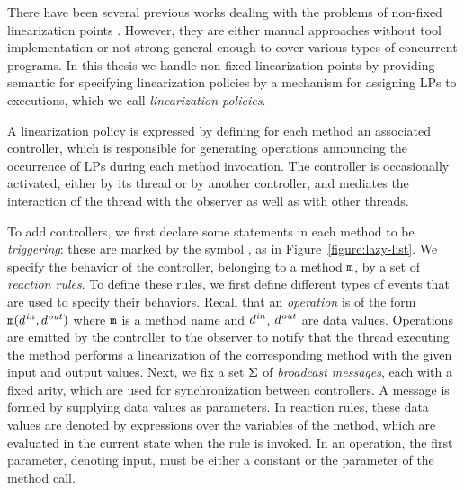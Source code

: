  There have been several previous works dealing with the problems of non-fixed linearization points \cite{Poling,Colvin:Lazy-List,CGLM:cav06,SWD:cav12,Derrick:fm14,SDW:tcl14,Vafeiadis:cav10,Vafeiadis:Aspect}. However, they are either manual approaches without tool implementation or not strong general enough to cover various types of concurrent programs. 
 In this thesis we handle non-fixed linearization points by providing semantic for specifying linearization policies by a mechanism for assigning LPs to executions, which we call \emph{linearization policies}. %

A linearization policy is expressed by defining for each method an associated controller, which is responsible for generating operations announcing the occurrence of LPs during each method invocation. The controller is occasionally activated, either by its thread or by another controller, and mediates the interaction of the thread with the
observer as well as with other threads.

To add controllers, we first declare 
some statements in each method to be {\it triggering}: 
these are marked by the symbol \commitpoint,
as in Figure~\ref{figure:lazy-list}.
%
We specify the behavior of the controller, belonging to a method
${\tt m}$, by a set  of
{\em reaction rules}. 
%
%
To define these rules, we first define different types of events
that are used to specify their behaviors.
%
Recall that an {\it operation} is of the form ${\tt m}(d^{\it in},d^{\it out})$ where 
${\tt m}$ is a method name and $d^{\it in}$, $d^{\it out}$ are data values.
Operations are emitted by the controller to the observer to notify 
that the thread executing the method performs a linearization of
the corresponding method with the given input and output values.
Next, we fix a set $\Sigma$ of {\it broadcast messages},
each with a fixed  arity, which are used for
synchronization between controllers. A message is formed by supplying data
values as parameters. In reaction rules, these data values are denoted by
expressions over the variables of the method, which are evaluated in the
current state when the rule is invoked. In an operation, the first
parameter, denoting input, must be either a constant
or the parameter of the method call.

